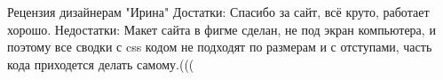 Рецензия дизайнерам "Ирина"
Достатки:    Спасибо за сайт, всё круто, работает хорошо.
Недостатки:     Макет сайта в фигме сделан, не под экран компьютера, и поэтому все сводки с css кодом не подходят по размерам и с отступами, часть кода приходется делать самому.(((